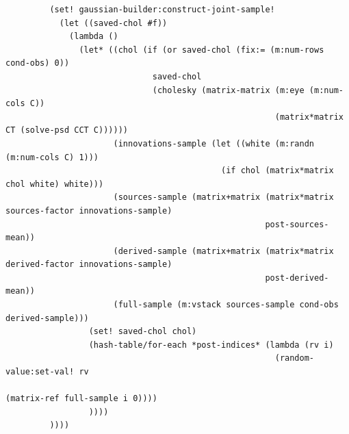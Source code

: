 \documentclass{article}
\begin{document}
\begin{verbatim}
         (set! gaussian-builder:construct-joint-sample!
           (let ((saved-chol #f))
             (lambda ()
               (let* ((chol (if (or saved-chol (fix:= (m:num-rows cond-obs) 0))
                              saved-chol
                              (cholesky (matrix-matrix (m:eye (m:num-cols C))
                                                       (matrix*matrix CT (solve-psd CCT C))))))
                      (innovations-sample (let ((white (m:randn (m:num-cols C) 1)))
                                            (if chol (matrix*matrix chol white) white)))
                      (sources-sample (matrix+matrix (matrix*matrix sources-factor innovations-sample)
                                                     post-sources-mean))
                      (derived-sample (matrix+matrix (matrix*matrix derived-factor innovations-sample)
                                                     post-derived-mean))
                      (full-sample (m:vstack sources-sample cond-obs derived-sample)))
                 (set! saved-chol chol)
                 (hash-table/for-each *post-indices* (lambda (rv i)
                                                       (random-value:set-val! rv
                                                                              (matrix-ref full-sample i 0))))
                 ))))
         ))))

\end{verbatim}



\end{document}
